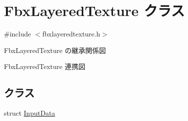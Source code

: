 \hypertarget{class_fbx_layered_texture}{}\section{Fbx\+Layered\+Texture クラス}
\label{class_fbx_layered_texture}


{\ttfamily \#include $<$fbxlayeredtexture.\+h$>$}



Fbx\+Layered\+Texture の継承関係図


Fbx\+Layered\+Texture 連携図
\subsection*{クラス}
\begin{DoxyCompactItemize}
\item 
struct \hyperlink{struct_fbx_layered_texture_1_1_input_data}{Input\+Data}
\end{DoxyCompactItemize}
